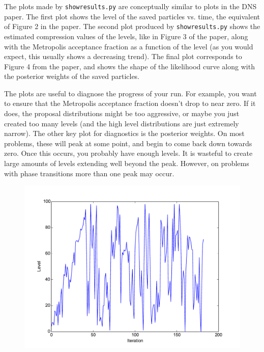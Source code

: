 \documentclass[a4paper, 11pt]{article}
\begin{document}
The plots made by {\tt showresults.py} are conceptually similar to plots in
the DNS paper. The first plot shows the level of the saved particles vs.
time, the equivalent of Figure 2 in the paper. The second plot produced by
{\tt showresults.py} shows the estimated compression values of the levels,
like in Figure 3 of the paper, along with the Metropolis acceptance fraction
as a function of the level (as you would expect, this usually shows a
decreasing trend). The final plot corresponds to Figure 4 from the paper, and
shows the shape of the likelihood curve along with the posterior weights of
the saved particles.

The plots are useful to diagnose the progress of your run. For example, you
want to ensure that the Metropolis acceptance fraction doesn't drop to near
zero. If it does, the proposal distributions might be too aggressive, or maybe
you just created too many levels (and the high level distributions are just
extremely narrow). The other key plot for diagnostics is the posterior
weights. On most problems, these will peak at some point, and begin to
come back down towards zero. Once this occurs, you probably have enough levels.
It is wasteful to create large amounts of levels extending well beyond the peak.
However, on problems with phase transitions more than one peak may occur.

\begin{figure}
\begin{center}
\includegraphics[scale=0.5]{fig1.pdf}
\caption{\label{fig:fig1}}
\end{center}
\end{figure}
\end{document}
